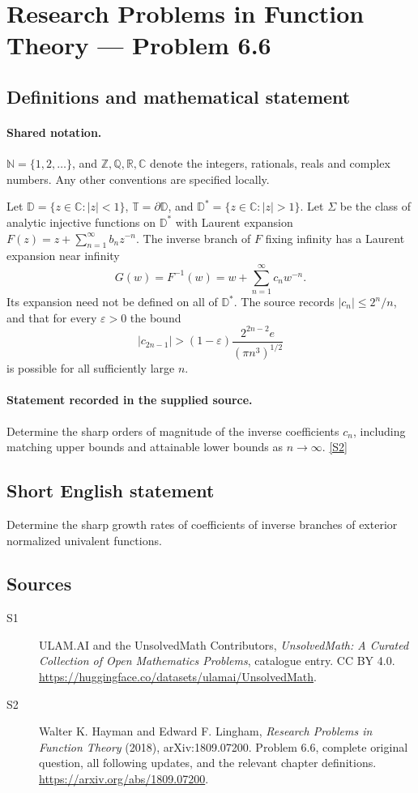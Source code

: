\documentclass[11pt]{book}
\newcommand{\sref}[2]{\hyperlink{source:#1:#2}{[S#2]}}
\begin{document}
\section{Research Problems in Function Theory — Problem 6.6}\label{statement}

\subsection{Definitions and mathematical statement}

\paragraph{Shared notation.}$\mathbb N=\{1,2,\ldots\}$, and $\mathbb Z,\mathbb Q,\mathbb R,\mathbb C$ denote the integers, rationals, reals and complex numbers. Any other conventions are specified locally.


Let $\mathbb D=\{z\in\mathbb C:|z|<1\}$, $\mathbb T=\partial\mathbb D$, and $\mathbb D^*=\{z\in\mathbb C:|z|>1\}$. Let $\Sigma$ be the class of analytic injective functions on $\mathbb D^*$ with Laurent expansion $F(z)=z+\sum_{n=1}^{\infty}b_nz^{-n}$. The inverse branch of $F$ fixing infinity has a Laurent expansion near infinity \[G(w)=F^{-1}(w)=w+\sum_{n=1}^{\infty}c_nw^{-n}.\] Its expansion need not be defined on all of $\mathbb D^*$. The source records $|c_n|\le2^n/n$, and that for every $\varepsilon>0$ the bound \[|c_{2n-1}|>(1-\varepsilon)\frac{2^{2n-2}e}{(\pi n^3)^{1/2}}\] is possible for all sufficiently large $n$.
\paragraph{Statement recorded in the supplied source.}
Determine the sharp orders of magnitude of the inverse coefficients $c_n$, including matching upper bounds and attainable lower bounds as $n\to\infty$. \sref{statement}{2}
\subsection{Short English statement}
Determine the sharp growth rates of coefficients of inverse branches of exterior normalized univalent functions.
\subsection{Sources}
\begin{description}
\item[\hypertarget{source:statement:1}{S1}] ULAM.AI and the UnsolvedMath Contributors, \emph{UnsolvedMath: A Curated Collection of Open Mathematics Problems}, catalogue entry. CC BY 4.0. \url{https://huggingface.co/datasets/ulamai/UnsolvedMath}.
\item[\hypertarget{source:statement:2}{S2}] Walter K. Hayman and Edward F. Lingham, \emph{Research Problems in Function Theory} (2018), arXiv:1809.07200. Problem 6.6, complete original question, all following updates, and the relevant chapter definitions. \url{https://arxiv.org/abs/1809.07200}.
\end{description}
\label{end:statement}
\end{document}
